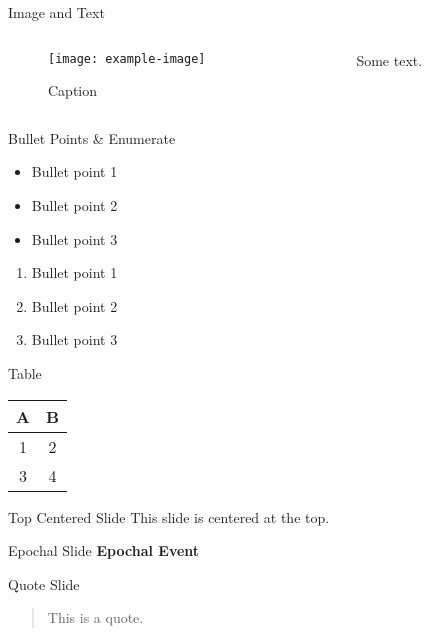\documentclass[11pt,aspectratio=169] {beamer}
\begin{document}
\begin{frame}{Image and Text}
\begin{columns}
\begin{column}{0.4 \textwidth}
\begin{figure}
\texttt{[image: example-image]}
\caption{Caption}
\end{figure}
\end{column}
\begin{column}{0.4\textwidth}
Some text.
\end{column}
\end{columns}
\end{frame}

\begin{frame}{Bullet Points \& Enumerate}
\begin{itemize}
\item Bullet point 1
\item Bullet point 2
\item Bullet point 3
\end{itemize}
\begin{enumerate}
\item Bullet point 1
\item Bullet point 2
\item Bullet point 3
\end{enumerate}
\end{frame}

\begin{frame}{Table}
\begin{tabular}{|c|c|}
\hline
A & B \\
\hline
1 & 2 \\
3 & 4 \\
\hline
\end{tabular}
\end{frame}

\begin{frame}[t]{Top Centered Slide}
This slide is centered at the top.
\end{frame}

\begin{frame}{Epochal Slide}
\centering
\textbf{\Huge Epochal Event}
\end{frame}

\begin{frame}{Quote Slide}
\begin{quote}
This is a quote.
\end{quote}
\end{frame}
\end{document}
